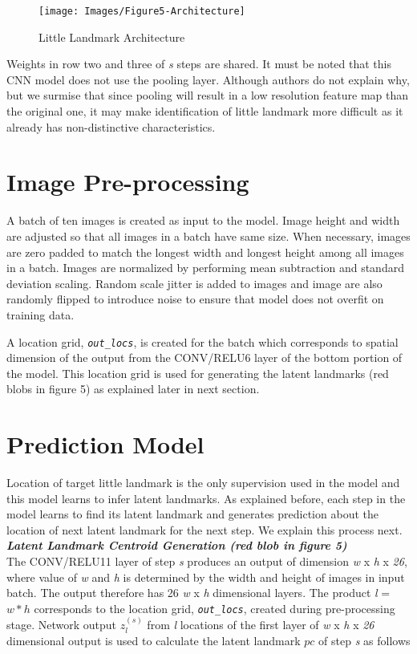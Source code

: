 \documentclass [11pt,letterpaper ,twoside ,openany ]{report}
\begin{document}
    \begin{figure}[h]
      \centering
      \texttt{[image: Images/Figure5-Architecture]}
      \caption{Little Landmark Architecture}
      \label{fig:arch}
    \end{figure}            

    Weights in row two and three of \textit {s} steps are shared. It must be noted that this CNN model does not use the pooling layer. Although authors do not explain why, but we surmise that since pooling will result in a low resolution feature map than the original one, it may make identification of little landmark more difficult as it already has non-distinctive characteristics.

    \section{Image Pre-processing}
    A batch of ten images is created as input to the model. Image height and width are adjusted so that all images in a batch have same size. When necessary, images are zero padded to match the longest width and longest height among all images in a batch. Images are normalized by performing mean subtraction and standard deviation scaling. Random scale jitter is added to images and image are also randomly flipped to introduce noise to ensure that model does not overfit on training data.

    A location grid, \textit{\texttt{out\_locs}},  is created for the batch which corresponds to spatial dimension of the output from the CONV/RELU6 layer of the bottom portion of the model. This location grid is used for generating the latent landmarks (red blobs in figure 5) as explained later in next section.

    \section{Prediction Model}
    Location of target little landmark is the only supervision used in the model and this model learns to infer latent landmarks. As explained before, each step in the model learns to find its latent landmark and generates prediction about the location of next latent landmark for the next step. We explain this process next.\\


    \noindent
    \textbf{\textit{Latent Landmark Centroid Generation (red blob in figure 5)}}\\
    The CONV/RELU11 layer of step \textit {s} produces an output of dimension \textit {w} x \textit {h} x \textit {26}, where value of \textit {w} and \textit {h} is determined by the width and height of images in input batch. The output therefore has 26 \textit {w} x \textit {h} dimensional layers. The product \textit {l} = \(w*h\) corresponds to the location grid, \textit{\texttt{out\_locs}}, created during pre-processing stage. Network output \(z_l^{(s)}\) from \textit {l} locations of the first layer of \textit {w} x \textit {h} x \textit {26} dimensional output is used to calculate the latent landmark \(pc\) of step \textit {s} as follows    
\end{document}
